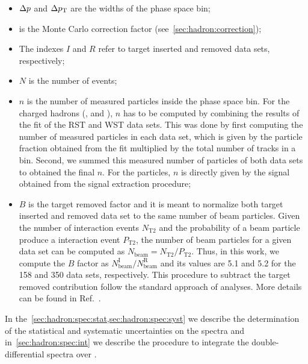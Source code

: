 \begin{itemize}

\item $\Delta p$ and $\Delta p_\text{T}$ are the widths of the phase space bin;

\item \cmc is the Monte Carlo correction factor (see~\cref{sec:hadron:correction});

\item The indexes $I$ and $R$ refer to target inserted and removed data sets, respectively;
  
\item $N$ is the number of events;

\item $n$ is the number of measured particles inside the phase space bin.
  For the charged hadrons (\pions, \kaons and \protonpm),
  $n$ has to be computed by combining the results of the \dedx fit of
  the RST and WST data sets. This was done by first computing
  the number of measured particles in each data set,
  which is given by the particle fraction obtained
  from the \dedx fit multiplied by the total
  number of tracks in a bin. Second, we summed this measured
  number of particles of both data sets to obtained the final $n$.
  For the \vzero particles, $n$ is directly given by the signal obtained
  from the signal extraction procedure;

\item $B$ is the target removed factor and it is meant to normalize
  both target inserted and removed data set to the same
  number of beam particles. Given the number of interaction events
  $N_\text{T2}$ and the probability of a beam particle produce a
  interaction event $P_\text{T2}$, the number of beam particles
  for a given data set can be computed as $N_\text{beam} = N_\text{T2}/P_\text{T2}$. 
  Thus, in this work, we compute the $B$ factor as 
  $N_\text{beam}^\text{I}/N_\text{beam}^\text{R}$ and its values are 5.1 and 5.2
  for the 158 and 350 \GeVc data sets, respectively. 
  This procedure to subtract
  the target removed contribution follow the standard approach
  of \NASixtyOne analyses. More details can be found in Ref.~\cite{AntoniMThesis}.
  
\end{itemize}

In the~\cref{sec:hadron:spec:stat,sec:hadron:spec:syst}
we describe the determination of the
statistical and systematic uncertainties on the spectra
and in~\cref{sec:hadron:spec:int} we describe the procedure to
integrate the double-differential spectra over \pT.

